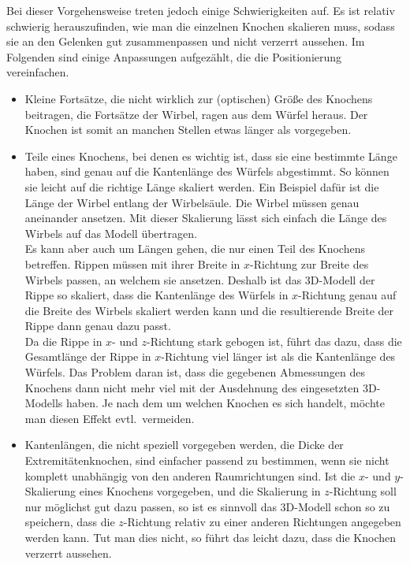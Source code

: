 Bei dieser Vorgehensweise treten jedoch einige Schwierigkeiten auf. Es ist \zb  relativ schwierig herauszufinden, wie man die einzelnen Knochen skalieren muss, sodass sie an den Gelenken gut zusammenpassen und nicht verzerrt aussehen. Im Folgenden sind einige Anpassungen aufgezählt, die die Positionierung vereinfachen.
\begin{itemize}
 \item Kleine Fortsätze, die nicht wirklich zur (optischen) Größe des Knochens beitragen, \zb die Fortsätze der Wirbel, ragen aus dem Würfel heraus. Der Knochen ist somit an manchen Stellen etwas länger als vorgegeben.
 
 \item Teile eines Knochens, bei denen es wichtig ist, dass sie eine bestimmte Länge haben, sind genau auf die Kantenlänge des Würfels abgestimmt. So können sie leicht auf die richtige Länge skaliert werden. 
 Ein Beispiel dafür ist die Länge der Wirbel entlang der Wirbelsäule. Die Wirbel müssen genau aneinander ansetzen. Mit dieser Skalierung lässt sich einfach die Länge des Wirbels auf das Modell übertragen.\\
 Es kann aber auch um Längen gehen, die nur einen Teil des Knochens betreffen.
 Rippen müssen \zb mit ihrer Breite in $x$-Richtung zur Breite des Wirbels passen, an welchem sie ansetzen. Deshalb ist das 3D-Modell der Rippe so skaliert, dass die Kantenlänge des Würfels in $x$-Richtung genau auf die Breite des Wirbels skaliert werden kann und die resultierende Breite der Rippe dann genau dazu passt.\\
 Da die Rippe in $x$- und $z$-Richtung stark gebogen ist, führt das dazu, dass die Gesamtlänge der Rippe in $x$-Richtung viel länger ist als die Kantenlänge des Würfels. Das Problem daran ist, dass die gegebenen Abmessungen des Knochens dann nicht mehr viel mit der Ausdehnung des eingesetzten 3D-Modells haben. Je nach dem um welchen Knochen es sich handelt, möchte man diesen Effekt evtl.\ vermeiden.
 
 \item Kantenlängen, die nicht speziell vorgegeben werden, \zb die Dicke der Extremitätenknochen, sind einfacher passend zu bestimmen, wenn sie nicht komplett unabhängig von den anderen Raumrichtungen sind. Ist \zb die $x$- und $y$-Skalierung eines Knochens vorgegeben, und die Skalierung in $z$-Richtung soll nur möglichst gut dazu passen, so ist es sinnvoll das 3D-Modell schon so zu speichern, dass die $z$-Richtung relativ zu einer anderen Richtungen angegeben werden kann. Tut man dies nicht, so führt das leicht dazu, dass die Knochen verzerrt aussehen.
\end{itemize}


